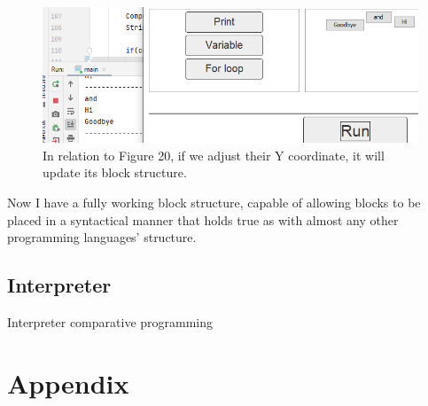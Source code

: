 \documentclass[a4paper, 12pt]{article}
\begin{document}
            \begin{figure}[h]
                \centering
                \includegraphics[width=120mm]{blockstructure4.png}
                \caption{In relation to Figure 20, if we adjust their Y coordinate, it will update
                its block structure.}
            \end{figure}
            
            Now I have a fully working block structure, capable of allowing blocks to be placed in a
            syntactical manner that holds true as with almost any other programming languages' structure.

        \clearpage
        \subsection{Interpreter}
            Interpreter comparative programming \\
 
    \clearpage
    \section{Appendix}
\end{document}
